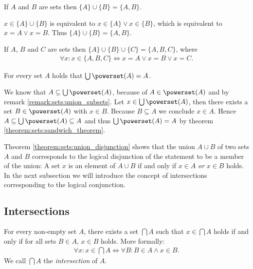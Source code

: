 \begin{examples}
    \begin{exampleenumerate}
        \item If $A$ and $B$ are sets then $\{A\}\cup\{B\}=\{A,B\}$.
        \begin{miniproof}
            $x\in\{A\}\cup\{B\}$ is equivalent to $x\in\{A\}\lor x\in\{B\}$, which is equivalent to $x=A\lor x=B$. Thus $\{A\}\cup\{B\}=\{A,B\}$.
        \end{miniproof}
        \item If $A$, $B$ and $C$ are sets then $\{A\}\cup\{B\}\cup\{C\}=\{A,B,C\}$, where
        \begin{align}\forall x\colon x\in\{A,B,C\}\Leftrightarrow x=A\lor x=B\lor x=C.\end{align}
        \item For every set $A$ holds that $\bigcup \powerset(A)=A$.
        \begin{miniproof}
            We know that $A\subseteq \bigcup\powerset(A)$, because of $A\in\powerset(A)$ and by remark \ref{remark:sets:union_subsets}.
            Let $x\in\bigcup\powerset(A)$, then there exists a set $B\in\powerset(A)$ with $x\in B$. Because $B\subseteq A$ we conclude $x\in A$. Hence $A\subseteq\bigcup\powerset(A)\subseteq A$ and thus $\bigcup\powerset(A)=A$ by theorem \ref{theorem:sets:sandwich_theorem}.
        \end{miniproof}
    \end{exampleenumerate}
\end{examples}

Theorem \ref{theorem:sets:union_disjunction} shows that the union $A\cup B$ of two sets $A$ and $B$ corresponds to the logical disjunction of the statement to be a member of the union: A set $x$ is an element of $A\cup B$ if and only if $x\in A$ \emph{or} $x\in B$ holds. In the next subsection we will introduce the concept of intersections corresponding to the logical conjunction.

\subsection{Intersections}

\begin{theorem}[Intersection]
    For every non-empty set $A$, there exists a set $\bigcap A$ such that $x\in\bigcap A$ holds if and only if for all sets $B\in A$, $x\in B$ holds. More formally:
    \begin{align}\forall x\colon x\in\bigcap A\Leftrightarrow\forall B\colon B\in A\wedge x\in B.\end{align}
    We call $\bigcap A$ the \emph{intersection} of $A$.
\end{theorem}

